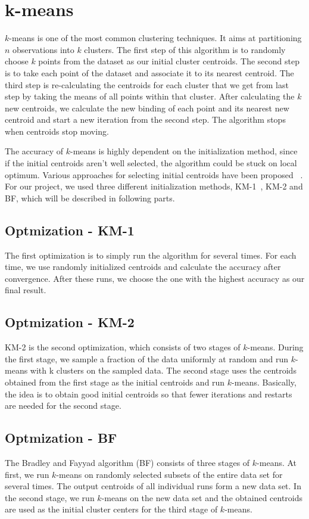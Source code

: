 \documentclass{acm_proc_article-sp}
\begin{document}
\section{k-means}
$k$-means is one of the most common clustering techniques. It aims at partitioning $n$ observations into $k$ clusters. The first step of this algorithm is to randomly choose $k$ points from the dataset as our initial cluster centroids. The second step is to take each point of the dataset and associate it to its nearest centroid. The third step is re-calculating the centroids for each cluster that we get from last step by taking the means of all points within that cluster. After calculating the $k$ new centroids, we calculate the new binding of each point and its nearest new centroid and start a new iteration from the second step. The algorithm stops when centroids stop moving.

The accuracy of $k$-means is highly dependent on the initialization method, since if the initial centroids aren’t well selected, the algorithm could be stuck on local optimum. Various approaches for selecting initial centroids have been proposed ~\cite{kanungo2002efficient, arthur2007k, khan2004cluster}. For our project, we used three different initialization methods, KM-1~\cite{hartigan1979algorithm}, KM-2 and BF, which will be described in following parts.

\subsection{Optmization - KM-1}
The first optimization is to simply run the algorithm for several times. For each time, we use randomly initialized centroids and calculate the accuracy after convergence. After these runs, we choose the one with the highest accuracy as our final result.
\subsection{Optmization - KM-2}
KM-2 is the second optimization, which consists of two stages of $k$-means. During the first stage, we sample a fraction of the data uniformly at random and run $k$-means with k clusters on the sampled data. The second stage uses the centroids obtained from the first stage as the initial centroids and run $k$-means. Basically, the idea is to obtain good initial centroids so that fewer iterations and restarts are needed for the second stage.
\subsection{Optmization - BF}
The Bradley and Fayyad algorithm (BF) consists of three stages of $k$-means. At first, we run $k$-means on randomly selected subsets of the entire data set for several times. The output centroids of all individual runs form a new data set. In the second stage, we run $k$-means on the new data set and the obtained centroids are used as the initial cluster centers for the third stage of $k$-means.
\end{document}
